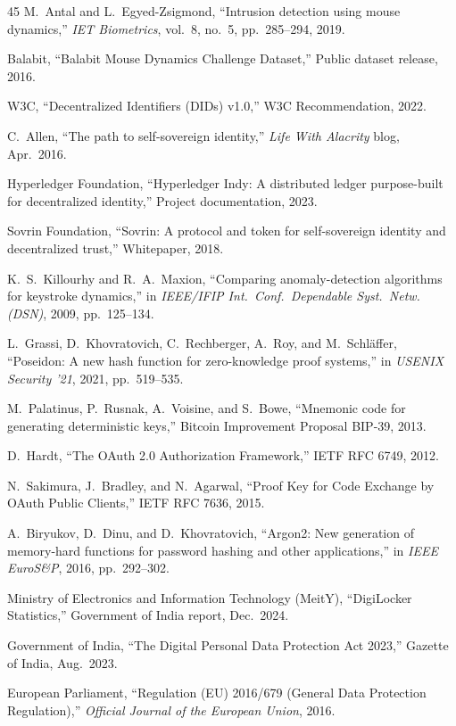 \documentclass[journal,twoside,10pt]{IEEEtran}
\begin{document}
\begin{thebibliography}{45}
M.~Antal and L.~Egyed-Zsigmond, ``Intrusion detection using mouse dynamics,''
\emph{IET Biometrics}, vol.~8, no.~5, pp.~285--294, 2019.

Balabit, ``Balabit Mouse Dynamics Challenge Dataset,'' Public dataset
release, 2016.

W3C, ``Decentralized Identifiers (DIDs) v1.0,'' W3C Recommendation, 2022.

C.~Allen, ``The path to self-sovereign identity,'' \emph{Life With
Alacrity} blog, Apr.\ 2016.

Hyperledger Foundation, ``Hyperledger Indy: A distributed ledger purpose-built
for decentralized identity,'' Project documentation, 2023.

Sovrin Foundation, ``Sovrin: A protocol and token for self-sovereign
identity and decentralized trust,'' Whitepaper, 2018.

K.~S.~Killourhy and R.~A.~Maxion, ``Comparing anomaly-detection algorithms
for keystroke dynamics,'' in \emph{IEEE/IFIP Int.\ Conf.\ Dependable Syst.\
Netw. (DSN)}, 2009, pp.~125--134.

L.~Grassi, D.~Khovratovich, C.~Rechberger, A.~Roy, and M.~Schl{\"a}ffer,
``Poseidon: A new hash function for zero-knowledge proof systems,'' in
\emph{USENIX Security '21}, 2021, pp.~519--535.

M.~Palatinus, P.~Rusnak, A.~Voisine, and S.~Bowe, ``Mnemonic code for
generating deterministic keys,'' Bitcoin Improvement Proposal BIP-39,
2013.

D.~Hardt, ``The OAuth 2.0 Authorization Framework,'' IETF RFC 6749, 2012.

N.~Sakimura, J.~Bradley, and N.~Agarwal, ``Proof Key for Code Exchange by
OAuth Public Clients,'' IETF RFC 7636, 2015.

A.~Biryukov, D.~Dinu, and D.~Khovratovich, ``Argon2: New generation of
memory-hard functions for password hashing and other applications,'' in
\emph{IEEE EuroS\&P}, 2016, pp.~292--302.

Ministry of Electronics and Information Technology (MeitY), ``DigiLocker
Statistics,'' Government of India report, Dec.\ 2024.

Government of India, ``The Digital Personal Data Protection Act 2023,''
Gazette of India, Aug.\ 2023.

European Parliament, ``Regulation (EU) 2016/679 (General Data Protection
Regulation),'' \emph{Official Journal of the European Union}, 2016.

\end{thebibliography}
\end{document}
